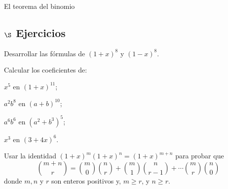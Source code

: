 \begin{section}{El teorema del binomio}
\subsection*{$\S$ Ejercicios}\label{ej3.6.1}
\begin{enumex}
\item Desarrollar las fórmulas de $(1+x)^8$ y $(1-x)^8$.

\item Calcular los coeficientes de:
\begin{enumex}
    \begin{minipage}{0.40\textwidth}
    \item $x^5$ en $(1+x)^{11}$;
    \end{minipage}
    \begin{minipage}{0.40\textwidth}
    \item $a^2b^8 $ en $(a+b)^{10}$;
    \end{minipage}

    \begin{minipage}{0.40\textwidth}
    \item $a^6 b^6$ en $(a^2 +b^3)^5$;
    \end{minipage}
    \begin{minipage}{0.40\textwidth}
    \item $x^3$ en $(3+4x)^6$.
    \end{minipage}
\end{enumex}    

\item Usar la identidad $(1+x)^m(1+x)^n=(1+x)^{m+n}$ para probar que
$$
\binom{m+n}{r} =
\binom{m}{0}\binom{n}{r}+\binom{m}{1}\binom{n}{r-1}+\cdots
\binom{m}{r}\binom{n}{0}
$$
donde $m,n$ y $r$ son enteros positivos y, $m\ge r$, y $n \ge r$.
\end{enumex}
\end{section}

